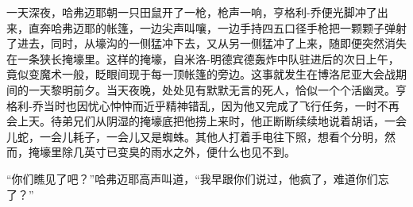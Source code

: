     一天深夜，哈弗迈耶朝一只田鼠开了一枪，枪声一响，亨格利-乔便光脚冲了出来，直奔哈弗迈耶的帐篷，一边尖声叫嚷，一边手持四五口径手枪把一颗颗子弹射了进去，同时，从壕沟的一侧猛冲下去，又从另一侧猛冲了上来，随即便突然消失在一条狭长掩壕里。这样的掩壕，自米洛-明德宾德轰炸中队驻进后的次日上午，竟似变魔术一般，眨眼间现于每一顶帐篷的旁边。这事就发生在博洛尼亚大会战期间的一天黎明前夕。当天夜晚，处处见有默默无言的死人，恰似一个个活幽灵。亨格利-乔当时也因忧心忡忡而近乎精神错乱，因为他又完成了飞行任务，一时不再会上天。待弟兄们从阴湿的掩壕底把他捞上来时，他正断断续续地说着胡话，一会儿蛇，一会儿耗子，一会儿又是蜘蛛。其他人打着手电往下照，想看个分明，然而，掩壕里除几英寸已变臭的雨水之外，便什么也见不到。

    “你们瞧见了吧？”哈弗迈耶高声叫道，“我早跟你们说过，他疯了，难道你们忘了？”
